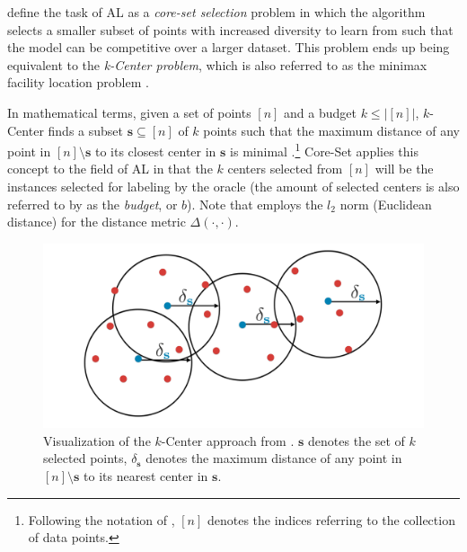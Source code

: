 \documentclass[english,bachelor,ul]{webisthesis} %
\begin{document}
\cite{DBLP:conf/iclr/SenerS18} define the task of AL as a \textit{core-set selection} problem in which the algorithm selects a smaller subset of points with increased diversity to learn from such that the model can be competitive over a larger dataset. This problem ends up being equivalent to the \textit{k-Center problem}, which is also referred to as the minimax facility location problem \citep{DBLP:conf/iclr/SenerS18}. 

In mathematical terms, given a set of points $ [n] $ and a budget $ k \leq |[n]| $, $k$-Center finds a subset $ \mathbf{s} \subseteq [n] $ of $ k $ points such that the maximum distance of any point in $ [n] \setminus \mathbf{s} $ to its closest center in $ \mathbf{s} $ is minimal \citep{har2008geometric}.\footnote{Following the notation of \cite{DBLP:conf/iclr/SenerS18}, $ [n] $ denotes the indices referring to the collection of data points.} Core-Set applies this concept to the field of AL in that the $ k $ centers selected from $ [n] $ will be the instances selected for labeling by the oracle (the amount of selected centers is also referred to by \cite{DBLP:conf/iclr/SenerS18} as the \textit{budget}, or $ b $). Note that \cite{DBLP:conf/iclr/SenerS18} employs the $ l_2 $ norm (Euclidean distance) for the distance metric $ \Delta(\cdot, \cdot) $. 

\vspace{0.2\baselineskip}

\begin{figure}[htbp]
    \centering
    \includegraphics[width=1\textwidth]{img/coreset.png}
    \caption{Visualization of the $k$-Center approach from \cite{DBLP:conf/iclr/SenerS18}. $ \mathbf{s} $ denotes the set of $ k $ selected points, $ \delta_{\mathbf{s}} $ denotes the maximum distance of any point in $ [n] \setminus \mathbf{s} $ to its nearest center in $ \mathbf{s} $.}
    \label{fig:coreset}
\end{figure}
\end{document}

